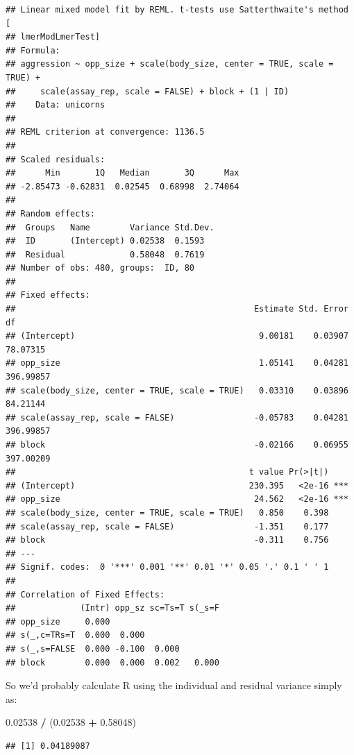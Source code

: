 \documentclass[
  12pt,
]{book}
\newenvironment{Shaded}{\begin{snugshade}}{\end{snugshade}}
\newcommand{\FloatTok}[1]{\textcolor[rgb]{0.00,0.00,0.81}{#1}}
\newcommand{\NormalTok}[1]{#1}
\newcommand{\OperatorTok}[1]{\textcolor[rgb]{0.81,0.36,0.00}{\textbf{#1}}}
\newcommand{\StringTok}[1]{\textcolor[rgb]{0.31,0.60,0.02}{#1}}
\begin{document}
\begin{verbatim}
## Linear mixed model fit by REML. t-tests use Satterthwaite's method [
## lmerModLmerTest]
## Formula: 
## aggression ~ opp_size + scale(body_size, center = TRUE, scale = TRUE) +  
##     scale(assay_rep, scale = FALSE) + block + (1 | ID)
##    Data: unicorns
## 
## REML criterion at convergence: 1136.5
## 
## Scaled residuals: 
##      Min       1Q   Median       3Q      Max 
## -2.85473 -0.62831  0.02545  0.68998  2.74064 
## 
## Random effects:
##  Groups   Name        Variance Std.Dev.
##  ID       (Intercept) 0.02538  0.1593  
##  Residual             0.58048  0.7619  
## Number of obs: 480, groups:  ID, 80
## 
## Fixed effects:
##                                                Estimate Std. Error        df
## (Intercept)                                     9.00181    0.03907  78.07315
## opp_size                                        1.05141    0.04281 396.99857
## scale(body_size, center = TRUE, scale = TRUE)   0.03310    0.03896  84.21144
## scale(assay_rep, scale = FALSE)                -0.05783    0.04281 396.99857
## block                                          -0.02166    0.06955 397.00209
##                                               t value Pr(>|t|)    
## (Intercept)                                   230.395   <2e-16 ***
## opp_size                                       24.562   <2e-16 ***
## scale(body_size, center = TRUE, scale = TRUE)   0.850    0.398    
## scale(assay_rep, scale = FALSE)                -1.351    0.177    
## block                                          -0.311    0.756    
## ---
## Signif. codes:  0 '***' 0.001 '**' 0.01 '*' 0.05 '.' 0.1 ' ' 1
## 
## Correlation of Fixed Effects:
##             (Intr) opp_sz sc=Ts=T s(_s=F
## opp_size     0.000                      
## s(_,c=TRs=T  0.000  0.000               
## s(_,s=FALSE  0.000 -0.100  0.000        
## block        0.000  0.000  0.002   0.000
\end{verbatim}

So we'd probably calculate R using the individual and residual variance simply as:

\begin{Shaded}
\begin{Highlighting}[]
\FloatTok{0.02538} \OperatorTok{/}\StringTok{ }\NormalTok{(}\FloatTok{0.02538} \OperatorTok{+}\StringTok{ }\FloatTok{0.58048}\NormalTok{)}
\end{Highlighting}
\end{Shaded}

\begin{verbatim}
## [1] 0.04189087
\end{verbatim}
\end{document}
